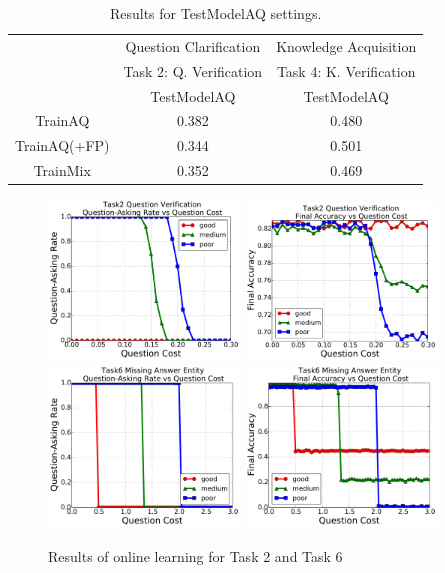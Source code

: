 \begin{table}[h!]
\centering
\small
\begin{tabular}{ccc}\toprule
& Question Clarification & Knowledge Acquisition \\
&Task 2: Q. Verification& Task 4: K. Verification\\
&TestModelAQ&TestModelAQ\\\midrule
TrainAQ&0.382 &0.480 \\
TrainAQ(+FP)&0.344&0.501 \\
TrainMix&0.352&0.469 \\\bottomrule
\end{tabular}
\caption{Results for TestModelAQ settings. }
\label{TestModelAQ}
\end{table}



\begin{figure}[!ht]
\begin{center}
\includegraphics[width=2in]{img/Task2Pro.pdf}
\includegraphics[width=2in]{img/Task2Acc.pdf}\\
\includegraphics[width=2in]{img/Task6Pro.pdf}
\includegraphics[width=2in]{img/Task6Acc.pdf}\\
\end{center}
\caption{Results of online learning for Task 2 and Task 6
\label{part-result}
}
\end{figure}

